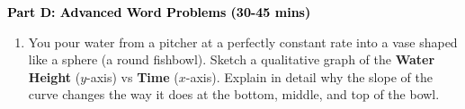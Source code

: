 \documentclass[12pt, letterpaper, fleqn]{article}
\begin{document}
\newpage

\begin{tcolorbox}[colback=customteal!20]
\large\textcolor{black}{\textbf{Part D: Advanced Word Problems (30-45 mins)}}
\end{tcolorbox}

\vspace{3mm}

\begin{enumerate}[itemsep=5.5cm, leftmargin=0.6cm, resume]
\item You pour water from a pitcher at a perfectly constant rate into a vase shaped like a sphere (a round fishbowl). Sketch a qualitative graph of the \textbf{Water Height} ($y$-axis) vs \textbf{Time} ($x$-axis). Explain in detail why the slope of the curve changes the way it does at the bottom, middle, and top of the bowl.
\end{enumerate}
\end{document}
